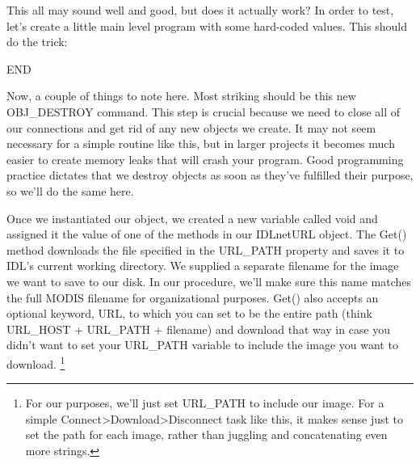 \documentclass{book}
\newcommand{\codefill}{\centering$\longrightarrow$\hfill{\color{gray}\rule[0.1\baselineskip]{0.5\linewidth}{2pt}}\hfill$\longleftarrow$}
\newcounter{highlight}[page]
\newcommand{\tikzhighlightanchor}[1]{\ensuremath{\vcenter{\hbox{\tikz[remember picture, overlay]{\coordinate (#1 highlight \arabic{highlight});}}}}}
\newcommand{\bh}[0]{\stepcounter{highlight}\tikzhighlightanchor{begin}}
\newcommand{\eh}[0]{\tikzhighlightanchor{end}}
\theoremstyle{aside_style}
\begin{document}
This all may sound well and good, but does it actually work? In order to test, let's create a little main level program with some hard-coded values.
This should do the trick:

\begin{idl}
END


   


\end{idl}

Now, a couple of things to note here. 
Most striking should be this new OBJ\_DESTROY command.
This step is crucial because we need to close all of our connections and get rid of any new objects we create. 
It may not seem necessary for a simple routine like this, but in larger projects it becomes much easier to create memory leaks that will crash your program.
Good programming practice dictates that we destroy objects as soon as they've fulfilled their purpose, so we'll do the same here.

Once we instantiated our object, we created a new variable called void and assigned it the value of one of the methods in our IDLnetURL object.
The Get() method downloads the file specified in the URL\_PATH property and saves it to IDL's current working directory.
We supplied a separate filename for the image we want to save to our disk.
In our procedure, we'll make sure this name matches the full MODIS filename for organizational purposes.
Get() also accepts an optional keyword, URL, to which you can set to be the entire path (think URL\_HOST + URL\_PATH + filename) and download that way
in case you didn't want to set your URL\_PATH variable to include the image you want to download.
\footnote{For our purposes, we'll just set URL\_PATH to include our image. For a simple Connect>Download>Disconnect task like this, 
it makes sense just to set the path for each image, rather than juggling and concatenating even more strings.}
\end{document}
